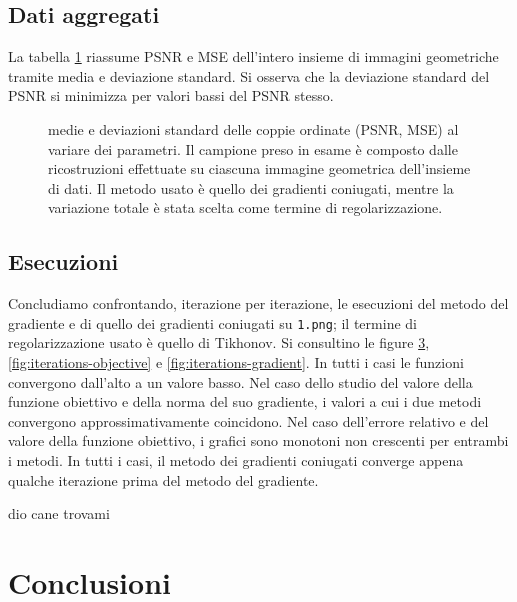 \documentclass[a4paper]{article}
\begin{document}
\subsection{Dati aggregati}
La tabella \ref{fig:aggregation} riassume PSNR e MSE dell'intero insieme di
immagini geometriche tramite media e deviazione standard.
Si osserva che la deviazione standard del PSNR si minimizza per valori bassi del
PSNR stesso.
\begin{figure}[H]
  \begin{center}
    \scalebox{0.65}{}
  \end{center}
  \caption{medie e deviazioni standard delle coppie ordinate (PSNR, MSE) al
  variare dei parametri. Il campione preso in esame è composto dalle
  ricostruzioni effettuate su ciascuna immagine geometrica dell'insieme di
  dati. Il metodo usato è quello dei gradienti coniugati, mentre la variazione
  totale è stata scelta come termine di regolarizzazione.}
  \label{fig:aggregation}
\end{figure}

\subsection{Esecuzioni}
Concludiamo confrontando, iterazione per iterazione, le esecuzioni del metodo
del gradiente e di quello dei gradienti coniugati su \verb!1.png!; il termine di
regolarizzazione usato è quello di Tikhonov. Si consultino le figure
\ref{fig:iterations-error}, \ref{fig:iterations-objective} e
\ref{fig:iterations-gradient}. In tutti i casi le funzioni convergono dall'alto
a un valore basso. Nel caso dello studio del valore della funzione obiettivo e
della norma del suo gradiente, i valori a cui i due metodi convergono
approssimativamente coincidono. Nel caso dell'errore relativo e del valore della
funzione obiettivo, i grafici sono monotoni non crescenti per entrambi i metodi.
In tutti i casi, il metodo dei gradienti coniugati converge appena qualche
iterazione prima del metodo del gradiente.
\begin{figure}[H]
    \centering
    \begin{subfigure}{.3\textwidth}
      \centering
      \scalebox{.65}{!}{}
      \label{fig:iterations-error}
    \end{subfigure}
\end{figure}
dio cane trovami

\section{Conclusioni}
\end{document}
